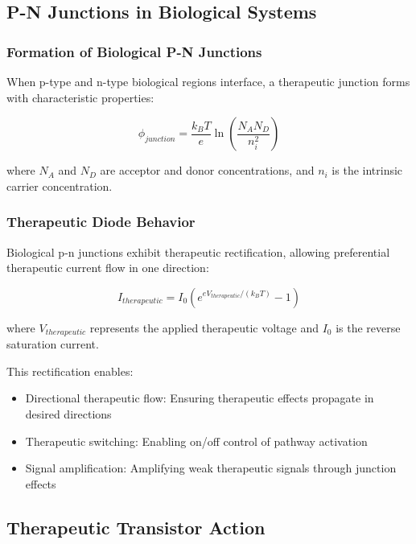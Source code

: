 \documentclass[12pt,a4paper]{article}
\begin{document}
\subsection{P-N Junctions in Biological Systems}

\subsubsection{Formation of Biological P-N Junctions}

When p-type and n-type biological regions interface, a therapeutic junction forms with characteristic properties:

\begin{equation}
\phi_{junction} = \frac{k_B T}{e} \ln\left(\frac{N_A N_D}{n_i^2}\right)
\end{equation}

where $N_A$ and $N_D$ are acceptor and donor concentrations, and $n_i$ is the intrinsic carrier concentration.

\subsubsection{Therapeutic Diode Behavior}

Biological p-n junctions exhibit therapeutic rectification, allowing preferential therapeutic current flow in one direction:

\begin{equation}
I_{therapeutic} = I_0 \left(e^{eV_{therapeutic}/(k_B T)} - 1\right)
\end{equation}

where $V_{therapeutic}$ represents the applied therapeutic voltage and $I_0$ is the reverse saturation current.

This rectification enables:
\begin{itemize}
\item Directional therapeutic flow: Ensuring therapeutic effects propagate in desired directions
\item Therapeutic switching: Enabling on/off control of pathway activation
\item Signal amplification: Amplifying weak therapeutic signals through junction effects
\end{itemize}

\subsection{Therapeutic Transistor Action}
\end{document}
